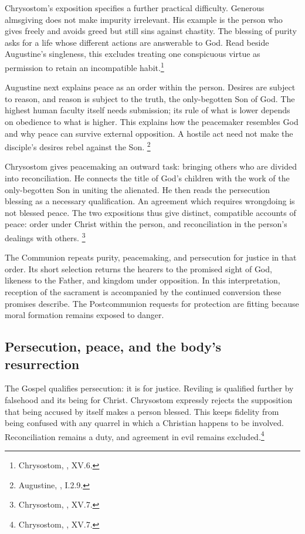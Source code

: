 Chrysostom's exposition specifies a further practical difficulty.
Generous almsgiving does not make impurity irrelevant. His example
is the person who gives freely and avoids greed but still sins
against chastity. The blessing of purity asks for a life whose
different actions are answerable to God. Read beside Augustine's
singleness, this excludes treating one conspicuous virtue as
permission to retain an incompatible habit.\footnote{Chrysostom,
, XV.6.}

Augustine next explains peace as an order within the person.
Desires are subject to reason, and reason is subject to the truth,
the only-begotten Son of God. The highest human faculty itself
needs submission; its rule of what is lower depends on obedience
to what is higher. This explains how the peacemaker resembles
God and why peace can survive external opposition. A hostile
act need not make the disciple's desires rebel against the Son.
\footnote{Augustine, , I.2.9.}

Chrysostom gives peacemaking an outward task: bringing others who
are divided into reconciliation. He connects the title of God's
children with the work of the only-begotten Son in uniting the
alienated. He then reads the persecution blessing as a necessary
qualification. An agreement which requires wrongdoing is not
blessed peace. The two expositions thus give distinct, compatible
accounts of peace: order under Christ within the person, and
reconciliation in the person's dealings with others.
\footnote{Chrysostom, , XV.7.}

The Communion repeats purity, peacemaking, and persecution for
justice in that order. Its short selection returns the hearers
to the promised sight of God, likeness to the Father, and kingdom
under opposition. In this interpretation, reception of the
sacrament is accompanied by the continued conversion these
promises describe. The Postcommunion requests for protection
are fitting because moral formation remains exposed to danger.

\subsection{Persecution, peace, and the body's resurrection}
The Gospel qualifies persecution: it is for justice. Reviling is
qualified further by falsehood and its being for Christ.
Chrysostom expressly rejects the supposition that being accused
by itself makes a person blessed. This keeps fidelity from being
confused with any quarrel in which a Christian happens to be
involved. Reconciliation remains a duty, and agreement in evil
remains excluded.\footnote{Chrysostom, , XV.7.}

